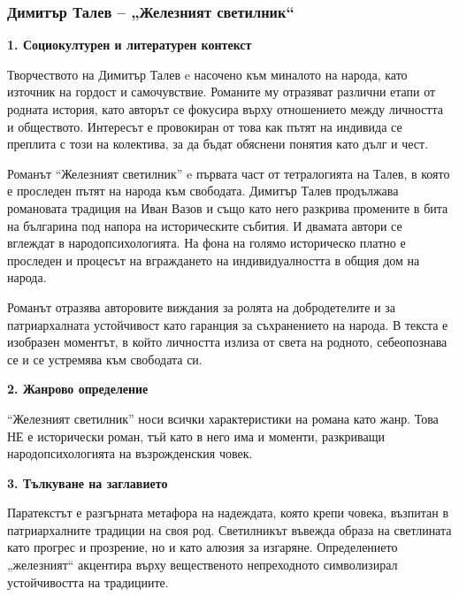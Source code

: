 \documentclass[12pt,a4paper]{article}
\begin{document}
\subsubsection{\colorbox{green!40}{Димитър Талев – „Железният светилник“}}

\textbf{1. Социокултурен и литературен контекст}
\vspace{0.1cm}
 
\indent Творчеството на Димитър Талев e насочено към миналото на народа, като източник на гордост и самочувствие. Романите му отразяват различни етапи от родната история, като авторът се фокусира върху отношението между личността и обществото. Интересът е провокиран от това как пътят на индивида се преплита с този на колектива, за да бъдат обяснени понятия като дълг и чест.
\vspace{0.1cm}
 
\indent Романът “Железният светилник” e първата част от тетралогията на Талев, в която е проследен пътят на народа към свободата. Димитър Талев продължава романовата традиция на Иван Вазов и също като него разкрива промените в бита на българина под напора на историческите събития. И двамата автори се вглеждат в народопсихологията. На фона на голямо историческо платно е проследен и процесът на вграждането на индивидуалността в общия дом на народа.
\vspace{0.1cm}
 
\indent Романът отразява авторовите виждания за ролята на добродетелите и за патриархалната  устойчивост като гаранция за съхранението на народа. В текста е изобразен моментът, в който личността излиза от света на родното, себеопознава се и се устремява към свободата си.
\vspace{0.1cm}
 
\textbf{2. Жанрово определение}
\vspace{0.1cm}
 
\indent “Железният светилник” носи всички характеристики на романа като жанр. Това НЕ е исторически роман, тъй като в него има и моменти, разкриващи народопсихологията на възрожденския човек.
\vspace{0.1cm}
 
\textbf{3. Тълкуване на заглавието}
\vspace{0.1cm}
 
\indent Паратекстът е разгърната метафора на надеждата, която крепи човека, възпитан в патриархалните традиции на своя род. Светилникът въвежда образа на светлината като прогрес и прозрение, но и като алюзия за изгаряне. Определението „железният“ акцентира върху вещественото непреходното символизирал устойчивостта на традициите.
\vspace{0.1cm}
 
\end{document}
